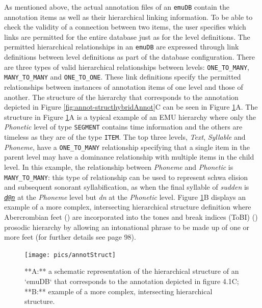 \documentclass[]{book}
\begin{document}
As mentioned above, the actual annotation files of an \texttt{emuDB} contain the annotation items as well as their hierarchical linking information. To be able to check the validity of a connection between two items, the user specifies which links are permitted for the entire database just as for the level definitions. The permitted hierarchical relationships in an \texttt{emuDB} are expressed through link definitions between level definitions as part of the database configuration. There are three types of valid hierarchical relationships between levels: \texttt{ONE\_TO\_MANY}, \texttt{MANY\_TO\_MANY} and \texttt{ONE\_TO\_ONE}. These link definitions specify the permitted relationships between instances of annotation items of one level and those of another. The structure of the hierarchy that corresponds to the annotation depicted in Figure \ref{fig:annot-structhybridAnnot}C can be seen in Figure \ref{fig:annotStruct}A. The structure in Figure \ref{fig:annotStruct}A is a typical example of an EMU hierarchy where only the \textit{Phonetic} level of type \texttt{SEGMENT} contains time information and the others are timeless as they are of the type \texttt{ITEM}. The top three levels, \emph{Text}, \emph{Syllable} and \emph{Phoneme}, have a \texttt{ONE\_TO\_MANY} relationship specifying that a single item in the parent level may have a dominance relationship with multiple items in the child level. In this example, the relationship between \textit{Phoneme} and \emph{Phonetic} is \texttt{MANY\_TO\_MANY}: this type of relationship can be used to represent schwa elision and subsequent sonorant syllabification, as when the final syllable of \emph{sudden} is \emph{\href{mailto:d@n}{\nolinkurl{d@n}}} at the \emph{Phoneme} level but \emph{dn} at the \emph{Phonetic} level. Figure \ref{fig:annotStruct}B displays an example of a more complex, intersecting hierarchical structure definition where Abercrombian feet (\citet{abercombie:1967a}) are incorporated into the tones and break indices (ToBI) (\citet{beckman:1997aa}) prosodic hierarchy by allowing an intonational phrase to be made up of one or more feet (for further details see \citet{harrington:2010a} page 98).

\begin{figure}

{\centering \texttt{[image: pics/annotStruct]} 

}

\caption{**A:** a schematic representation of the hierarchical structure of an `emuDB` that corresponds to the annotation depicted in figure 4.1C; **B:** example of a more complex, intersecting hierarchical structure.}\label{fig:annotStruct}
\end{figure}
\end{document}
